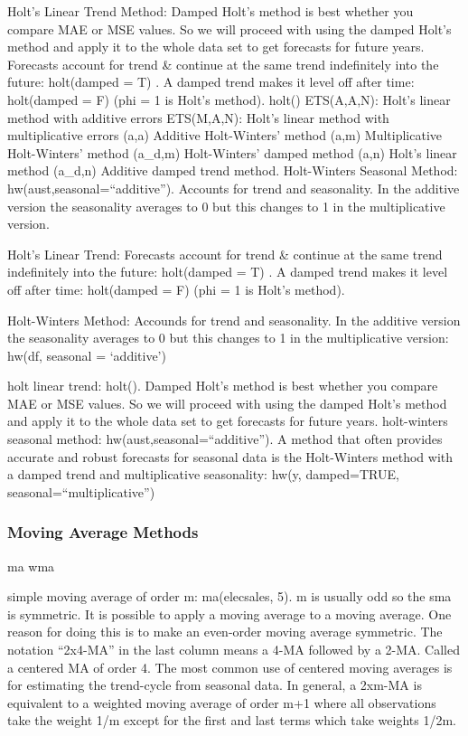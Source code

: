 \documentclass[]{book}
\begin{document}
Holt's Linear Trend Method: Damped Holt's method is best whether you compare MAE or MSE values. So we will proceed with using the damped Holt's method and apply it to the whole data set to get forecasts for future years. Forecasts account for trend \& continue at the same trend indefinitely into the future: holt(damped = T) . A damped trend makes it level off after time: holt(damped = F) (phi = 1 is Holt's method). holt() \textbar{} ETS(A,A,N): Holt's linear method with additive errors \textbar{} ETS(M,A,N): Holt's linear method with multiplicative errors \textbar{} (a,a) Additive Holt-Winters' method \textbar{} (a,m) Multiplicative Holt-Winters' method \textbar{} (a\_d,m) Holt-Winters' damped method \textbar{} (a,n) Holt's linear method \textbar{} (a\_d,n) Additive damped trend method. Holt-Winters Seasonal Method: hw(aust,seasonal=``additive''). Accounts for trend and seasonality. In the additive version the seasonality averages to 0 but this changes to 1 in the multiplicative version.

Holt's Linear Trend: Forecasts account for trend \& continue at the same trend indefinitely into the future: holt(damped = T) . A damped trend makes it level off after time: holt(damped = F) (phi = 1 is Holt's method).

Holt-Winters Method: Accounds for trend and seasonality. In the additive version the seasonality averages to 0 but this changes to 1 in the multiplicative version: hw(df, seasonal = `additive')

holt linear trend: holt(). Damped Holt's method is best whether you compare MAE or MSE values. So we will proceed with using the damped Holt's method and apply it to the whole data set to get forecasts for future years. holt-winters seasonal method: hw(aust,seasonal=``additive''). A method that often provides accurate and robust forecasts for seasonal data is the Holt-Winters method with a damped trend and multiplicative seasonality: hw(y, damped=TRUE, seasonal=``multiplicative'')

\hypertarget{moving-average-methods}{%
\subsubsection{Moving Average Methods}\label{moving-average-methods}}

ma wma

simple moving average of order m: ma(elecsales, 5). m is usually odd so the sma is symmetric. It is possible to apply a moving average to a moving average. One reason for doing this is to make an even-order moving average symmetric. The notation ``2x4-MA'' in the last column means a 4-MA followed by a 2-MA. Called a centered MA of order 4. The most common use of centered moving averages is for estimating the trend-cycle from seasonal data. In general, a 2xm-MA is equivalent to a weighted moving average of order m+1 where all observations take the weight 1/m except for the first and last terms which take weights 1/2m.
\end{document}
